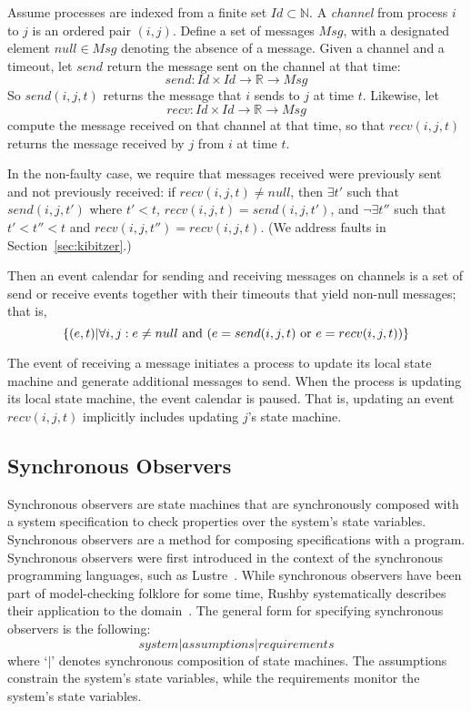 \documentclass{IEEEtran/IEEEtran}
\newcommand{\lee}[1]{ } %
\newcommand{\lee}[1]{ {\color{blue}$<$lee: #1$>$} } %
\begin{document}
Assume processes are indexed from a finite set $Id \subset \mathbb{N}$. A \emph{channel} from process $i$ to $j$ is an ordered pair $(i,j)$. Define a set of messages $Msg$, with a designated element $null \in Msg$ denoting the absence of a message. Given a channel and a timeout, let $send$ return the message sent on the channel at that time:
$$send : Id \times Id \rightarrow \mathbb{R} \rightarrow Msg$$
So $send(i, j, t)$ returns the message that $i$ sends to $j$ at time $t$. Likewise, let
$$recv : Id \times Id \rightarrow \mathbb{R} \rightarrow Msg$$
compute the message received on that channel at that time, so that $recv(i, j, t)$ returns the message received by $j$ from $i$ at time $t$.

In the non-faulty case, we require that messages received were previously sent and not previously received: if $recv(i, j, t) \neq null$, then $\exists t'$ such that $send(i, j, t')$ where $t' < t$, $recv(i, j, t) = send(i, j, t')$, and $\neg\exists t''$ such that $t' < t'' < t$ and $recv(i, j, t'') = recv(i, j, t)$. (We address faults in Section~\ref{sec:kibitzer}.)

Then an event calendar for sending and receiving messages on channels is a set of send or receive events together with their timeouts that yield non-null messages; that is,
$$
\{ (e, t) | \forall i,j: e \neq null \textnormal{ and } (e = send(i, j, t) \textnormal{ or } e = recv(i, j, t))
\}
$$

\lee{technically, atomic time is just a convenience.}
The event of receiving a message initiates a process to update its local state machine and generate additional messages to send. When the process is updating its local state machine, the event calendar is paused. That is, updating an event $recv(i, j, t)$ implicitly includes updating $j$'s state machine.

\lee{note that we don't need full generality of send and receive events in OM(1)}

\subsection{Synchronous Observers}\label{sec:sync}
Synchronous observers are state machines that are synchronously composed with a system specification to check properties over the system's state variables. Synchronous observers are a method for composing specifications with a program. Synchronous observers were first introduced in the context of the synchronous programming languages, such as Lustre~\cite{}. While synchronous observers have been part of model-checking folklore for some time, Rushby systematically describes their application to the domain~\cite{}. The general form for specifying synchronous observers is the following:
$$system | assumptions | requirements$$
\noindent
where `$|$' denotes synchronous composition of state machines. The assumptions constrain the system's state variables, while the requirements monitor the system's state variables.
\end{document}
